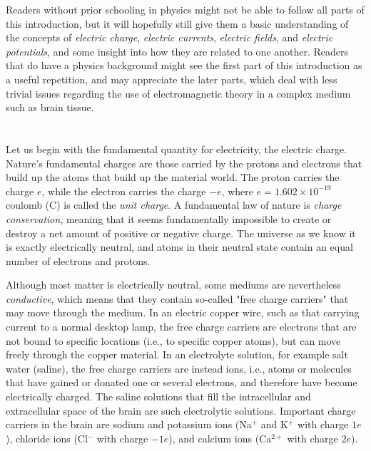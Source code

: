Readers without prior schooling in physics might not be able to follow all parts of this introduction, but it will hopefully still give them a basic understanding of the concepts of \textit{electric charge}, \textit{electric currents}, \textit{electric fields}, and \textit{electric potentials}, and some insight into how they are related to one another. Readers that do have a physics background might see the first part of this introduction as a useful repetition, and may appreciate the later parts, which deal with less trivial issues regarding the use of electromagnetic theory in a complex medium such as brain tissue.



\section{}
\label{sec:Basics:Charge} 
Let us begin with the fundamental quantity for electricity, the electric charge. Nature's fundamental charges are those carried by the protons and electrons that build up the atoms that build up the material world. The proton carries the charge $e$, while the electron carries the charge $-e$, where $e = 1.602\times10^{-19}$ coulomb (\si{\coulomb}) is called the \textit{unit charge}. A fundamental law of nature is {\it charge conservation}, meaning that it seems fundamentally impossible to create or destroy a net amount of positive or negative charge. The universe as we know it is exactly electrically neutral, and atoms in their neutral state contain an equal number of electrons and protons.

Although most matter is electrically neutral, some mediums are nevertheless \textit{conductive}, which means that they contain so-called "free charge carriers" that may move through the medium. In an electric copper wire, such as that carrying current to a normal desktop lamp, the free charge carriers are electrons that are not bound to specific locations (i.e., to specific copper atoms), but can move freely through the copper material. In an electrolyte solution, for example salt water (saline), the free charge carriers are instead ions, i.e., atoms or molecules that have gained or donated one or several electrons, and therefore have become electrically charged. The saline solutions that fill the intracellular and extracellular space of the brain are such electrolytic solutions. Important charge carriers in the brain are sodium and potassium ions (Na$^+$ and K$^+$ with charge $1e$), chloride ions (Cl$^-$ with charge $-1e$), and calcium ions (Ca$^{2+}$ with charge $2e$).

